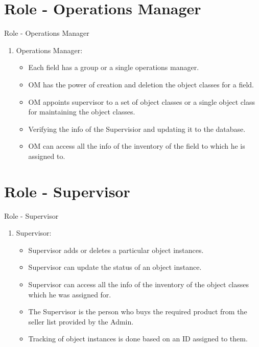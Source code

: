 \documentclass{beamer}
\begin{document}
\section{Role - Operations Manager}
\begin{frame}{Role - Operations Manager}
    \begin{enumerate}[]
        \item Operations Manager:
        \begin{itemize}
        \item Each field has a group or a single operations manager.
            \item OM has the power of creation and deletion the object classes for a field.
            \item OM appoints supervisor to a set of object classes or a single object class for maintaining the object classes.
            \item Verifying the info of the Supervisior and updating it to the database.
            \item OM can access all the info of the inventory of the field to which he is assigned to.
        \end{itemize}
    \end{enumerate}
\end{frame} 

\section{Role - Supervisor}
\begin{frame}{Role - Supervisor}
    \begin{enumerate}[]
        \item Supervisor:
        \begin{itemize}
            \item Supervisor adds or deletes a particular object instances.
            \item Supervisor can update the status of an object instance.
            \item Supervisor can access all the info of the inventory of the object classes which he was assigned for.
            \item The Supervisor is the person who buys the required product from the seller list provided by the Admin.
            \item Tracking of object instances is done based on an ID assigned to them.
        \end{itemize}
    \end{enumerate}
\end{frame}
\end{document}
